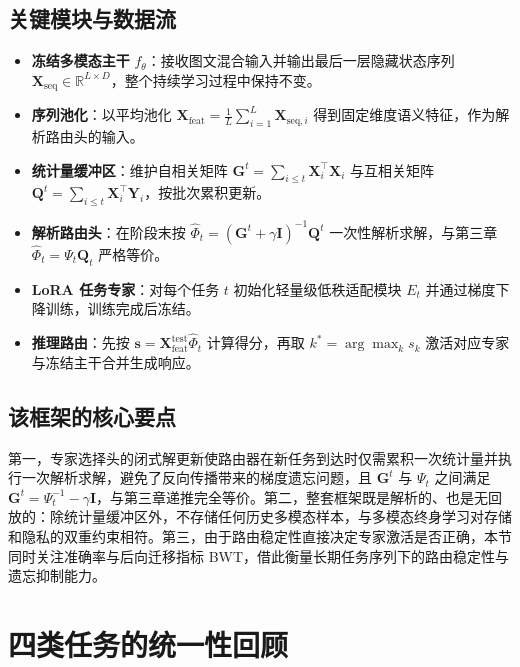 \subsection{关键模块与数据流}

\begin{itemize}
    \item \textbf{冻结多模态主干} $f_{\theta}$：接收图文混合输入并输出最后一层隐藏状态序列 $\mathbf{X}_{\mathrm{seq}} \in \mathbb{R}^{L\times D}$，整个持续学习过程中保持不变。
    \item \textbf{序列池化}：以平均池化 $\mathbf{X}_{\mathrm{feat}}=\frac{1}{L}\sum_{i=1}^{L}\mathbf{X}_{\mathrm{seq},i}$ 得到固定维度语义特征，作为解析路由头的输入。
    \item \textbf{统计量缓冲区}：维护自相关矩阵 $\mathbf{G}^{t}=\sum_{i\le t}\mathbf{X}_i^{\top}\mathbf{X}_i$ 与互相关矩阵 $\mathbf{Q}^{t}=\sum_{i\le t}\mathbf{X}_i^{\top}\mathbf{Y}_i$，按批次累积更新。
    \item \textbf{解析路由头}：在阶段末按 $\widehat{\Phi}_t=(\mathbf{G}^{t}+\gamma\mathbf{I})^{-1}\mathbf{Q}^{t}$ 一次性解析求解，与第三章 $\widehat{\Phi}_t=\Psi_t\mathbf{Q}_t$ 严格等价。
    \item \textbf{LoRA 任务专家}：对每个任务 $t$ 初始化轻量级低秩适配模块 $E_t$ 并通过梯度下降训练，训练完成后冻结。
    \item \textbf{推理路由}：先按 $\mathbf{s}=\mathbf{X}_{\mathrm{feat}}^{\mathrm{test}}\widehat{\Phi}_t$ 计算得分，再取 $k^{*}=\arg\max_k s_k$ 激活对应专家与冻结主干合并生成响应。
\end{itemize}

\subsection{该框架的核心要点}

第一，专家选择头的闭式解更新使路由器在新任务到达时仅需累积一次统计量并执行一次解析求解，避免了反向传播带来的梯度遗忘问题，且 $\mathbf{G}^{t}$ 与 $\Psi_t$ 之间满足 $\mathbf{G}^{t}=\Psi_t^{-1}-\gamma\mathbf{I}$，与第三章递推完全等价。第二，整套框架既是解析的、也是无回放的：除统计量缓冲区外，不存储任何历史多模态样本，与多模态终身学习对存储和隐私的双重约束相符。第三，由于路由稳定性直接决定专家激活是否正确，本节同时关注准确率与后向迁移指标 BWT，借此衡量长期任务序列下的路由稳定性与遗忘抑制能力。

\section{四类任务的统一性回顾}

